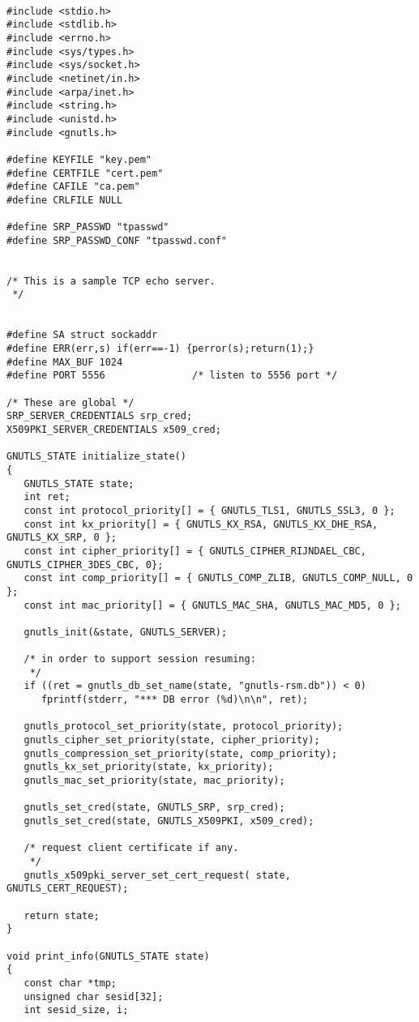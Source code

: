 \begin{verbatim}

#include <stdio.h>
#include <stdlib.h>
#include <errno.h>
#include <sys/types.h>
#include <sys/socket.h>
#include <netinet/in.h>
#include <arpa/inet.h>
#include <string.h>
#include <unistd.h>
#include <gnutls.h>

#define KEYFILE "key.pem"
#define CERTFILE "cert.pem"
#define CAFILE "ca.pem"
#define CRLFILE NULL

#define SRP_PASSWD "tpasswd"
#define SRP_PASSWD_CONF "tpasswd.conf"


/* This is a sample TCP echo server.
 */


#define SA struct sockaddr
#define ERR(err,s) if(err==-1) {perror(s);return(1);}
#define MAX_BUF 1024
#define PORT 5556               /* listen to 5556 port */

/* These are global */
SRP_SERVER_CREDENTIALS srp_cred;
X509PKI_SERVER_CREDENTIALS x509_cred;

GNUTLS_STATE initialize_state()
{
   GNUTLS_STATE state;
   int ret;
   const int protocol_priority[] = { GNUTLS_TLS1, GNUTLS_SSL3, 0 };
   const int kx_priority[] = { GNUTLS_KX_RSA, GNUTLS_KX_DHE_RSA, GNUTLS_KX_SRP, 0 };
   const int cipher_priority[] = { GNUTLS_CIPHER_RIJNDAEL_CBC, GNUTLS_CIPHER_3DES_CBC, 0};
   const int comp_priority[] = { GNUTLS_COMP_ZLIB, GNUTLS_COMP_NULL, 0 };
   const int mac_priority[] = { GNUTLS_MAC_SHA, GNUTLS_MAC_MD5, 0 };

   gnutls_init(&state, GNUTLS_SERVER);

   /* in order to support session resuming:
    */
   if ((ret = gnutls_db_set_name(state, "gnutls-rsm.db")) < 0)
      fprintf(stderr, "*** DB error (%d)\n\n", ret);

   gnutls_protocol_set_priority(state, protocol_priority);
   gnutls_cipher_set_priority(state, cipher_priority);
   gnutls_compression_set_priority(state, comp_priority);
   gnutls_kx_set_priority(state, kx_priority);
   gnutls_mac_set_priority(state, mac_priority);

   gnutls_set_cred(state, GNUTLS_SRP, srp_cred);
   gnutls_set_cred(state, GNUTLS_X509PKI, x509_cred);

   /* request client certificate if any.
    */
   gnutls_x509pki_server_set_cert_request( state, GNUTLS_CERT_REQUEST);
   
   return state;
}

void print_info(GNUTLS_STATE state)
{
   const char *tmp;
   unsigned char sesid[32];
   int sesid_size, i;


\end{verbatim}
